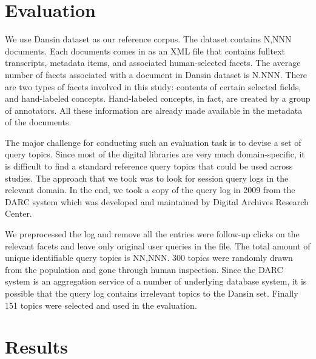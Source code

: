 \section{Evaluation}


We use Dansin dataset as our reference corpus.  The dataset contains N,NNN
documents.  Each documents comes in as an XML file that contains fulltext
transcripts, metadata items, and associated human-selected facets.  The average
number of facets associated with a document in Dansin dataset is N.NNN.  There
are two types of facets involved in this study: contents of certain selected
fields, and hand-labeled concepts.  Hand-labeled concepts, in fact, are created
by a group of annotators.  All these information are already made available in
the metadata of the documents.

The major challenge for conducting such an evaluation task is to devise a set
of query topics.  Since most of the digital libraries are very much
domain-specific, it is difficult to find a standard reference query topics that
could be used across studies.  The approach that we took was to look for
session query logs in the relevant domain.  In the end, we took a copy of the
query log in 2009 from the DARC system which was developed and maintained by
Digital Archives Research Center.  

We preprocessed the log and remove all the entries were follow-up clicks on the
relevant facets and leave only original user queries in the file.  The total
amount of unique identifiable query topics is NN,NNN.  300 topics were randomly
drawn from the population and gone through human inspection.  Since the DARC
system is an aggregation service of a number of underlying database system, it
is possible that the query log contains irrelevant topics to the Dansin set.
Finally 151 topics were selected and used in the evaluation.


\section{Results}

